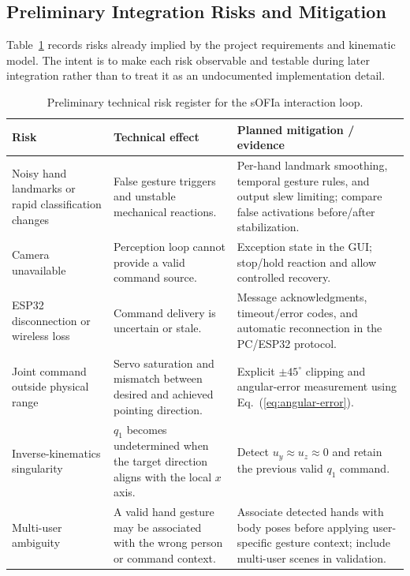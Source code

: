 \documentclass[lettersize,journal]{IEEEtran}
\begin{document}
\subsection{Preliminary Integration Risks and Mitigation}
\label{sec:risks}

Table~\ref{tab:risks} records risks already implied by the project requirements and kinematic model. The intent is to make each risk observable and testable during later integration rather than to treat it as an undocumented implementation detail.

\begin{table}[H]
\centering
\caption{Preliminary technical risk register for the sOFIa interaction loop.}
\label{tab:risks}
\scriptsize
\setlength{\tabcolsep}{2.5pt}
\begin{tabularx}{\columnwidth}{p{1.8cm}p{2.7cm}X}
\hline
\textbf{Risk} & \textbf{Technical effect} & \textbf{Planned mitigation / evidence} \\
\hline
Noisy hand landmarks or rapid classification changes & False gesture triggers and unstable mechanical reactions. & Per-hand landmark smoothing, temporal gesture rules, and output slew limiting; compare false activations before/after stabilization. \\
Camera unavailable & Perception loop cannot provide a valid command source. & Exception state in the GUI; stop/hold reaction and allow controlled recovery. \\
ESP32 disconnection or wireless loss & Command delivery is uncertain or stale. & Message acknowledgments, timeout/error codes, and automatic reconnection in the PC/ESP32 protocol. \\
Joint command outside physical range & Servo saturation and mismatch between desired and achieved pointing direction. & Explicit $\pm45^{\circ}$ clipping and angular-error measurement using Eq.~(\ref{eq:angular-error}). \\
Inverse-kinematics singularity & $q_1$ becomes undetermined when the target direction aligns with the local $x$ axis. & Detect $u_y\approx u_z\approx0$ and retain the previous valid $q_1$ command. \\
Multi-user ambiguity & A valid hand gesture may be associated with the wrong person or command context. & Associate detected hands with body poses before applying user-specific gesture context; include multi-user scenes in validation. \\
\hline
\end{tabularx}
\end{table}
\end{document}
